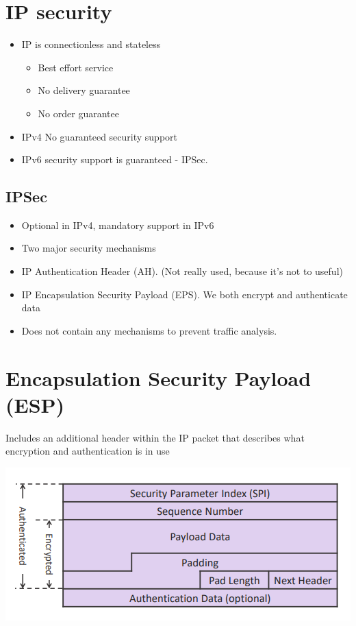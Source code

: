 \documentclass{article}
\begin{document}
\tableofcontents

\newpage

\section{IP security}
\begin{itemize}
  \item IP is connectionless and stateless
  \begin{itemize}
    \item Best effort service 
	  \item No delivery guarantee 
	  \item No order guarantee 
  \end{itemize}
	\item IPv4 No guaranteed security support 
	\item IPv6 security support is guaranteed - IPSec.
\end{itemize}

\subsection{IPSec}
\begin{itemize}
	\item Optional in IPv4, mandatory support in IPv6 
	\item Two major security mechanisms 
	\item IP Authentication Header (AH). (Not really used, because it's not to useful)
	\item IP Encapsulation Security Payload (EPS). We both encrypt and authenticate data
	\item Does not contain any mechanisms to prevent traffic analysis.
\end{itemize}

\section{Encapsulation Security Payload (ESP)}
\begin{flushleft}
Includes an additional header within the IP packet that describes what encryption and authentication is in use
\end{flushleft}
\begin{center}
  \includegraphics[scale=0.5]{esp_payload.png}
\end{center}
\end{document}
